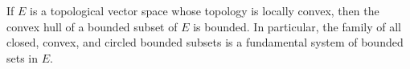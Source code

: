 If $E$ is a topological vector space whose topology is locally convex, then the convex hull of a bounded subset of $E$ is bounded. In particular, the family of all closed, convex, and circled bounded subsets is a fundamental system of bounded sets in $E$.
